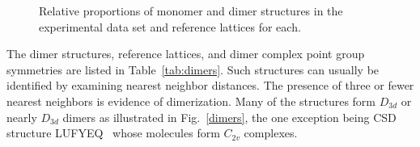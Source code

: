 \documentclass[preprint]{iucr}              %
\begin{document}
\begin{landscape}
\begin{figure}
\begin{center}
\end{center}
\caption[Monomer and dimer structures and their reference
lattices.]{Relative proportions of monomer and dimer structures in
the experimental data set and reference lattices for
each.}\label{dimerMonomer}
\end{figure}
\end{landscape}

The dimer structures, reference lattices, and dimer complex point
group symmetries are listed in Table~\ref{tab:dimers}.  Such
structures can usually be identified by examining nearest neighbor
distances. The presence of three or fewer nearest neighbors is
evidence of dimerization. Many of the structures form $D_{3d}$ or
nearly $D_{3d}$ dimers as illustrated in Fig.~\ref{dimers}, the one
exception being CSD structure LUFYEQ~\cite{Wrackmeyer02} whose
molecules form $C_{2v}$ complexes.
\end{document}
